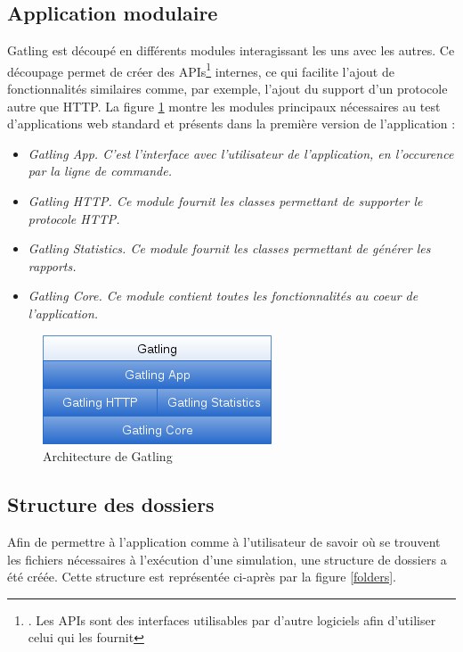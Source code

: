 \subsection{Application modulaire}
Gatling est découpé en différents modules interagissant les uns avec les autres. Ce découpage permet de créer des APIs\footnote{. Les APIs sont des interfaces utilisables par d'autre logiciels afin d'utiliser celui qui les fournit} internes, ce qui facilite l'ajout de fonctionnalités similaires comme, par exemple, l'ajout du support d'un protocole autre que HTTP. La figure \ref{arch} montre les modules principaux nécessaires au test d'applications web standard et présents dans la première version de l'application :
\begin{itemize}
  \item \em{Gatling App}. C'est l'interface avec l'utilisateur de l'application, en l'occurence par la ligne de commande.
  \item \em{Gatling HTTP}. Ce module fournit les classes permettant de supporter le protocole HTTP.
  \item \em{Gatling Statistics}. Ce module fournit les classes permettant de générer les rapports.
  \item \em{Gatling Core}. Ce module contient toutes les fonctionnalités au coeur de l'application.
\end{itemize}

\begin{figure}[h]
\begin{center}
\includegraphics{img/arch.png}
\end{center}
\caption{Architecture de Gatling}
\label{arch}
\end{figure}

\subsection{Structure des dossiers}
Afin de permettre à l'application comme à l'utilisateur de savoir où se trouvent les fichiers nécessaires à l'exécution d'une simulation, une structure de dossiers a été créée. Cette structure est représentée ci-après par la figure \ref{folders}.

